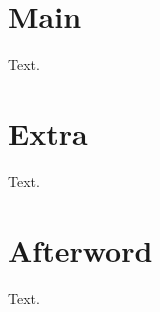 \documentclass{book}
\begin{document}
\tableofcontents
\mainmatter
\chapter{Main}
Text.
\appendix
\chapter{Extra}
Text.
\backmatter
\chapter{Afterword}
Text.
\end{document}
